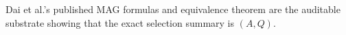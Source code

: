 Dai et al.'s published MAG formulas and equivalence theorem are the auditable substrate showing that the exact selection summary is \((A,Q)\).